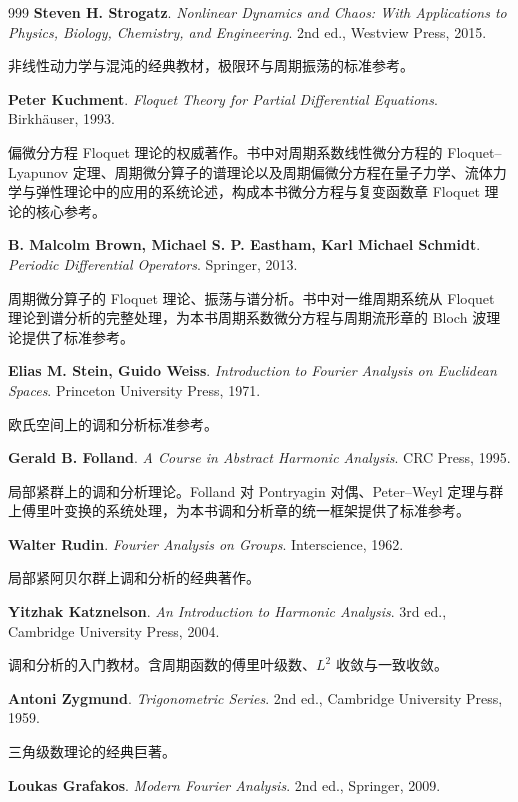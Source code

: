 \begin{thebibliography}{999}
 \textbf{Steven H. Strogatz}. \textit{Nonlinear Dynamics and Chaos: With Applications to Physics, Biology, Chemistry, and Engineering}. 2nd ed., Westview Press, 2015.

非线性动力学与混沌的经典教材，极限环与周期振荡的标准参考。

 \textbf{Peter Kuchment}. \textit{Floquet Theory for Partial Differential Equations}. Birkh\"auser, 1993.

偏微分方程 Floquet 理论的权威著作。书中对周期系数线性微分方程的 Floquet–Lyapunov 定理、周期微分算子的谱理论以及周期偏微分方程在量子力学、流体力学与弹性理论中的应用的系统论述，构成本书微分方程与复变函数章 Floquet 理论的核心参考。

 \textbf{B. Malcolm Brown, Michael S. P. Eastham, Karl Michael Schmidt}. \textit{Periodic Differential Operators}. Springer, 2013.

周期微分算子的 Floquet 理论、振荡与谱分析。书中对一维周期系统从 Floquet 理论到谱分析的完整处理，为本书周期系数微分方程与周期流形章的 Bloch 波理论提供了标准参考。

 \textbf{Elias M. Stein, Guido Weiss}. \textit{Introduction to Fourier Analysis on Euclidean Spaces}. Princeton University Press, 1971.

欧氏空间上的调和分析标准参考。

 \textbf{Gerald B. Folland}. \textit{A Course in Abstract Harmonic Analysis}. CRC Press, 1995.

局部紧群上的调和分析理论。Folland 对 Pontryagin 对偶、Peter–Weyl 定理与群上傅里叶变换的系统处理，为本书调和分析章的统一框架提供了标准参考。

 \textbf{Walter Rudin}. \textit{Fourier Analysis on Groups}. Interscience, 1962.

局部紧阿贝尔群上调和分析的经典著作。

 \textbf{Yitzhak Katznelson}. \textit{An Introduction to Harmonic Analysis}. 3rd ed., Cambridge University Press, 2004.

调和分析的入门教材。含周期函数的傅里叶级数、$L^2$ 收敛与一致收敛。

 \textbf{Antoni Zygmund}. \textit{Trigonometric Series}. 2nd ed., Cambridge University Press, 1959.

三角级数理论的经典巨著。

 \textbf{Loukas Grafakos}. \textit{Modern Fourier Analysis}. 2nd ed., Springer, 2009.


\end{thebibliography}
